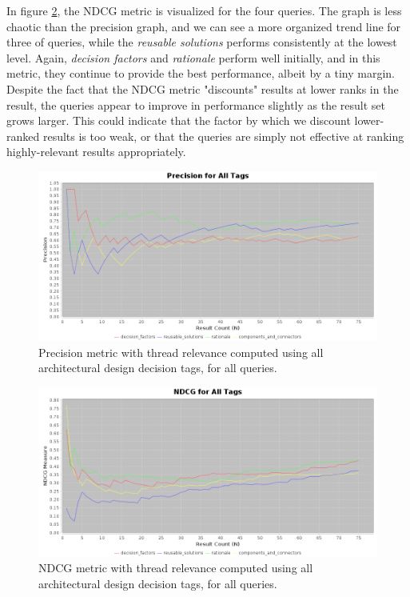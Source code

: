 \documentclass[a4paper, 12pt]{article}
\begin{document}
		In figure \ref{fig:ndcgall}, the NDCG metric is visualized for the four queries. The graph is less chaotic than the precision graph, and we can see a more organized trend line for three of queries, while the \textit{reusable solutions} performs consistently at the lowest level. Again, \textit{decision factors} and \textit{rationale} perform well initially, and in this metric, they continue to provide the best performance, albeit by a tiny margin. Despite the fact that the NDCG metric "discounts" results at lower ranks in the result, the queries appear to improve in performance slightly as the result set grows larger. This could indicate that the factor by which we discount lower-ranked results is too weak, or that the queries are simply not effective at ranking highly-relevant results appropriately.
		
		\begin{figure}
			\centering
			\includegraphics[width=\textwidth]{report/precision/precision_all.png}
			\caption{Precision metric with thread relevance computed using all architectural design decision tags, for all queries.}
			\label{fig:precisionall}
		\end{figure}
		
		\begin{figure}
			\centering
			\includegraphics[width=\textwidth]{report/precision/ndcg_all.png}
			\caption{NDCG metric with thread relevance computed using all architectural design decision tags, for all queries.}
			\label{fig:ndcgall}
		\end{figure}
	
\end{document}
